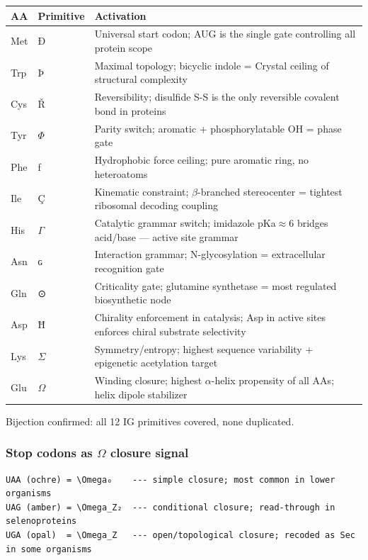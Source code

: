 \documentclass[12pt,a4paper]{article}
\begin{document}
\begin{table}[htbp]
\centering
\small
{}
\begin{tabularx}{\textwidth}{>{\centering\arraybackslash}X >{\centering\arraybackslash}X >{\centering\arraybackslash}X}
\toprule
\rowcolor{gray!25}\textbf{AA} & \textbf{Primitive} & \textbf{Activation} \\
\midrule
\rowcolors{1}{white}{gray!10}
Met & Ð & Universal start codon; AUG is the single gate controlling all protein scope \\
Trp & Þ & Maximal topology; bicyclic indole = Crystal ceiling of structural complexity \\
Cys & Ř & Reversibility; disulfide S-S is the only reversible covalent bond in proteins \\
Tyr & $\Phi$ & Parity switch; aromatic + phosphorylatable OH = phase gate \\
Phe & ƒ & Hydrophobic force ceiling; pure aromatic ring, no heteroatoms \\
Ile & Ç & Kinematic constraint; $\beta$-branched stereocenter = tightest ribosomal decoding coupling \\
His & $\Gamma$ & Catalytic grammar switch; imidazole pKa$\approx$6 bridges acid/base --- active site grammar \\
Asn & ɢ & Interaction grammar; N-glycosylation = extracellular recognition gate \\
Gln & ⊙ & Criticality gate; glutamine synthetase = most regulated biosynthetic node \\
Asp & Ħ & Chirality enforcement in catalysis; Asp in active sites enforces chiral substrate selectivity \\
Lys & $\Sigma$ & Symmetry/entropy; highest sequence variability + epigenetic acetylation target \\
Glu & $\Omega$ & Winding closure; highest $\alpha$-helix propensity of all AAs; helix dipole stabilizer \\
\bottomrule
\end{tabularx}
\end{table}

Bijection confirmed: all 12 IG primitives covered, none duplicated.

\subsubsection{Stop codons as $\Omega$ closure signal}

\begin{lstlisting}
UAA (ochre) = \Omega₀    --- simple closure; most common in lower organisms
UAG (amber) = \Omega_Z₂  --- conditional closure; read-through in selenoproteins
UGA (opal)  = \Omega_Z   --- open/topological closure; recoded as Sec in some organisms
\end{lstlisting}
\end{document}
